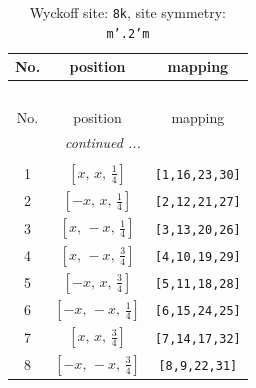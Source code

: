 \documentclass[fleqn,8pt]{jsarticle}
\begin{document}
\begin{longtable}{ccc}
\caption{Wyckoff site: {\tt 8k}, site symmetry: {\tt m'.2'm}}
 \\
 \hline \hline
No. & position & mapping \\ \hline \endfirsthead

\multicolumn{2}{l}{\tablename\ \thetable{}} \\
 \hline \hline
No. & position & mapping \\ \hline \endhead

 \hline \hline
\multicolumn{2}{r}{\footnotesize\it continued ...} \\ \endfoot

 \hline \hline
\multicolumn{2}{r}{} \\ \endlastfoot

1 & $\left[ x,\, x,\, \frac{1}{4} \right]$ & {\tt [1,16,23,30]} \\ \hline
2 & $\left[ - x,\, x,\, \frac{1}{4} \right]$ & {\tt [2,12,21,27]} \\ \hline
3 & $\left[ x,\, - x,\, \frac{1}{4} \right]$ & {\tt [3,13,20,26]} \\ \hline
4 & $\left[ x,\, - x,\, \frac{3}{4} \right]$ & {\tt [4,10,19,29]} \\ \hline
5 & $\left[ - x,\, x,\, \frac{3}{4} \right]$ & {\tt [5,11,18,28]} \\ \hline
6 & $\left[ - x,\, - x,\, \frac{1}{4} \right]$ & {\tt [6,15,24,25]} \\ \hline
7 & $\left[ x,\, x,\, \frac{3}{4} \right]$ & {\tt [7,14,17,32]} \\ \hline
8 & $\left[ - x,\, - x,\, \frac{3}{4} \right]$ & {\tt [8,9,22,31]} \\
\end{longtable}
\renewcommand{\arraystretch}{1.2}
\end{document}
